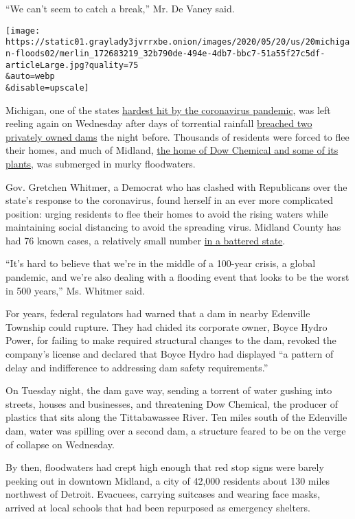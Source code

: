 ``We can't seem to catch a break,'' Mr. De Vaney said.

\texttt{[image: https://static01.graylady3jvrrxbe.onion/images/2020/05/20/us/20michigan-floods02/merlin\_172683219\_32b790de-494e-4db7-bbc7-51a55f27c5df-articleLarge.jpg?quality=75\\\&auto=webp\\\&disable=upscale]}

Michigan, one of the states
\href{https://www.nytimes3xbfgragh.onion/interactive/2020/us/michigan-coronavirus-cases.html}{hardest
hit by the coronavirus pandemic}, was left reeling again on Wednesday
after days of torrential rainfall
\href{https://www.nytimes3xbfgragh.onion/2020/05/19/us/michigan-dam-breach.html}{breached
two privately owned dams} the night before. Thousands of residents were
forced to flee their homes, and much of Midland,
\href{https://www.nytimes3xbfgragh.onion/2020/05/20/climate/michigan-dam-dow-chemical-superfund.html}{the
home of Dow Chemical and some of its plants}, was submerged in murky
floodwaters.

Gov. Gretchen Whitmer, a Democrat who has clashed with Republicans over
the state's response to the coronavirus, found herself in an ever more
complicated position: urging residents to flee their homes to avoid the
rising waters while maintaining social distancing to avoid the spreading
virus. Midland County has had 76 known cases, a relatively small number
\href{https://www.nytimes3xbfgragh.onion/2020/03/30/us/coronavirus-detroit.html}{in
a battered state}.

``It's hard to believe that we're in the middle of a 100-year crisis, a
global pandemic, and we're also dealing with a flooding event that looks
to be the worst in 500 years,'' Ms. Whitmer said.

For years, federal regulators had warned that a dam in nearby Edenville
Township could rupture. They had chided its corporate owner, Boyce Hydro
Power, for failing to make required structural changes to the dam,
revoked the company's license and declared that Boyce Hydro had
displayed ``a pattern of delay and indifference to addressing dam safety
requirements.''

On Tuesday night, the dam gave way, sending a torrent of water gushing
into streets, houses and businesses, and threatening Dow Chemical, the
producer of plastics that sits along the Tittabawassee River. Ten miles
south of the Edenville dam, water was spilling over a second dam, a
structure feared to be on the verge of collapse on Wednesday.

By then, floodwaters had crept high enough that red stop signs were
barely peeking out in downtown Midland, a city of 42,000 residents about
130 miles northwest of Detroit. Evacuees, carrying suitcases and wearing
face masks, arrived at local schools that had been repurposed as
emergency shelters.

